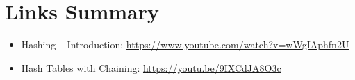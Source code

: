 \documentclass[11pt]{article}
\begin{document}
\section*{Links Summary}
\begin{itemize}[leftmargin=*]
    \item Hashing -- Introduction: \url{https://www.youtube.com/watch?v=wWgIAphfn2U}
    \item Hash Tables with Chaining: \url{https://youtu.be/9IXCdJA8O3c}
\end{itemize}
\end{document}
